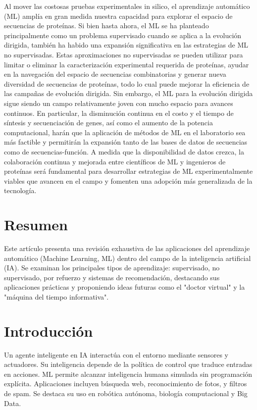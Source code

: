 \documentclass[12pt]{article}
\begin{document}
Al mover las costosas pruebas experimentales in silico, el aprendizaje automático (ML) amplía en gran medida nuestra capacidad para explorar el espacio de secuencias de proteínas. Si bien hasta ahora, el ML se ha planteado principalmente como un problema supervisado cuando se aplica a la evolución dirigida, también ha habido una expansión significativa en las estrategias de ML no supervisadas. Estas aproximaciones no supervisadas se pueden utilizar para limitar o eliminar la caracterización experimental requerida de proteínas, ayudar en la navegación del espacio de secuencias combinatorias y generar nueva diversidad de secuencias de proteínas, todo lo cual puede mejorar la eficiencia de las campañas de evolución dirigida. Sin embargo, el ML para la evolución dirigida sigue siendo un campo relativamente joven con mucho espacio para avances continuos. En particular, la disminución continua en el costo y el tiempo de síntesis y secuenciación de genes, así como el aumento de la potencia computacional, harán que la aplicación de métodos de ML en el laboratorio sea más factible y permitirán la expansión tanto de las bases de datos de secuencias como de secuencias-función. A medida que la disponibilidad de datos crezca, la colaboración continua y mejorada entre científicos de ML y ingenieros de proteínas será fundamental para desarrollar estrategias de ML experimentalmente viables que avancen en el campo y fomenten una adopción más generalizada de la tecnología.

\section*{Resumen}
Este art\'iculo presenta una revisi\'on exhaustiva de las aplicaciones del aprendizaje autom\'atico (Machine Learning, ML) dentro del campo de la inteligencia artificial (IA). Se examinan los principales tipos de aprendizaje: supervisado, no supervisado, por refuerzo y sistemas de recomendaci\'on, destacando sus aplicaciones pr\'acticas y proponiendo ideas futuras como el "doctor virtual" y la "m\'aquina del tiempo informativa".

\section{Introducci\'on}
Un agente inteligente en IA interact\'ua con el entorno mediante sensores y actuadores. Su inteligencia depende de la pol\'itica de control que traduce entradas en acciones. ML permite alcanzar inteligencia humana simulada sin programaci\'on expl\'icita. Aplicaciones incluyen b\'usqueda web, reconocimiento de fotos, y filtros de spam. Se destaca su uso en rob\'otica aut\'onoma, biolog\'ia computacional y Big Data.
\end{document}
